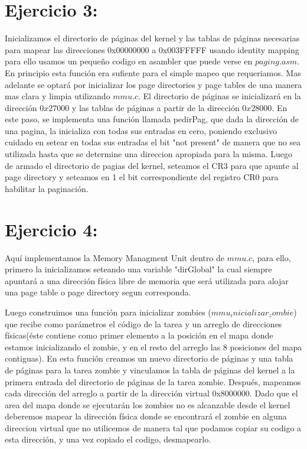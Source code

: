 \documentclass[a4paper]{article}
\begin{document}
\clearpage

\section{Ejercicio 3:}
%

Inicializamos el directorio de páginas del kernel y las tablas de páginas necesarias para mapear las direcciones 0x00000000 a 0x003FFFFF usando identity mapping para ello usamos un pequeño codigo en asambler que puede verse en $paging.asm$. En principio esta función era sufiente para el simple mapeo que requeriamos. Mas adelante se optará por inicializar los page directories y page tables de una manera mas clara y limpia utilizando $mmu.c$. El directorio de páginas se inicializará en la dirección $0x27000$ y las tablas de páginas a partir de la dirección $0x28000$. En este paso, se implementa una función llamada pedirPag, que dada la dirección de una pagina, la inicializa con todas sus entradas en cero, poniendo exclusivo cuidado en setear en todas sus entradas el bit "not present" de manera que no sea utilizada hasta que se determine una direccion apropiada para la misma. 
Luego de armado el directorio de pagias del kernel, seteamos el CR3 para que apunte al page directory y seteamos en 1 el bit correspondiente del registro CR0 para habilitar la paginación.

\clearpage

\section{Ejercicio 4:}
%

Aquí implementamos la Memory Managment Unit dentro de $mmu.c$, para ello, primero la inicializamos seteando una variable "dirGlobal" la cual siempre apuntará a una dirección física libre de memoria que será utilizada para alojar una page table o page directory segun corresponda.

Luego construimos una función para inicializar zombies ($mmu_inicializar_zombie$) que recibe como parámetros el código de la tarea y un arreglo de direcciones físicas(éste contiene como primer elemento a la posición en el mapa donde estamos inicializando el zombie, y en el resto del arreglo las 8 posiciones del mapa contiguas). En esta función creamos un nuevo directorio de páginas y una tabla de páginas para la tarea zombie y vinculamos la tabla de páginas del kernel a la primera entrada del directorio de páginas de la tarea zombie. Después, mapeamos cada dirección del arreglo a partir de la dirección virtual 0x8000000. 
Dado que el area del mapa donde se ejecutarán los zombies no es alcanzable desde el kernel deberemos mapear la dirección física donde se encontrará el zombie en alguna direccion virtual que no utilicemos de manera tal que podamos copiar su codigo a esta dirección, y una vez copiado el codigo, desmapearlo.
\end{document}
